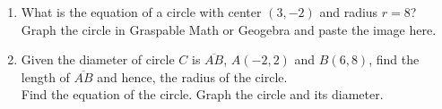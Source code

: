 \documentclass[12pt, twoside]{article}
\begin{document}
\begin{enumerate}
\newpage
\item What is the equation of a circle with center $(3,-2)$ and radius $r=8$?\\[0.5cm]
Graph the circle in Graspable Math or Geogebra and paste the image here.

\newpage
\item Given the diameter of circle $C$ is $\overline{AB}$, $A(-2,2)$ and $B(6,8)$, find the length of $\overline{AB}$ and hence, the radius of the circle.\\[0.25cm]
Find the equation of the circle. Graph the circle and its diameter.


\end{enumerate}
\end{document}

